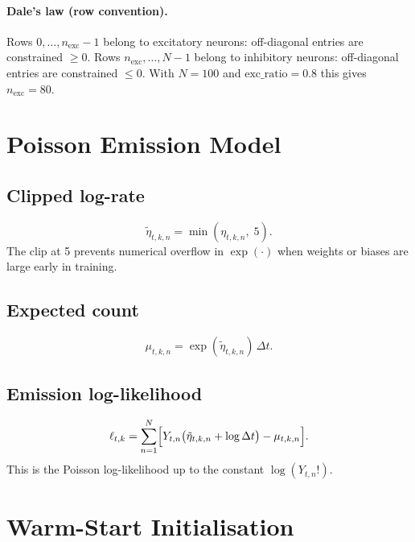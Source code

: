 \documentclass[11pt]{article}
\begin{document}
\paragraph{Dale's law (row convention).}
Rows $0,\ldots,n_{\mathrm{exc}}-1$ belong to excitatory neurons:
off-diagonal entries are constrained $\ge 0$.  Rows
$n_{\mathrm{exc}},\ldots,N-1$ belong to inhibitory neurons:
off-diagonal entries are constrained $\le 0$.
With $N=100$ and $\mathrm{exc\_ratio}=0.8$ this gives $n_{\mathrm{exc}}=80$.

\section{Poisson Emission Model}

\subsection{Clipped log-rate}
\begin{equation}
  \tilde\eta_{t,k,n} = \min(\eta_{t,k,n},\;5).
\end{equation}
The clip at 5 prevents numerical overflow in $\exp(\cdot)$ when weights or biases
are large early in training.

\subsection{Expected count}
\begin{equation}
  \mu_{t,k,n} = \exp(\tilde\eta_{t,k,n})\,\Delta t.
\end{equation}

\subsection{Emission log-likelihood}
\begin{equation}
  \ell_{t,k} = \sum_{n=1}^N
    \Bigl[Y_{t,n}\bigl(\tilde\eta_{t,k,n}+\log\Delta t\bigr) - \mu_{t,k,n}\Bigr].
\end{equation}
This is the Poisson log-likelihood up to the constant $\log(Y_{t,n}!)$.

\section{Warm-Start Initialisation}
\end{document}
